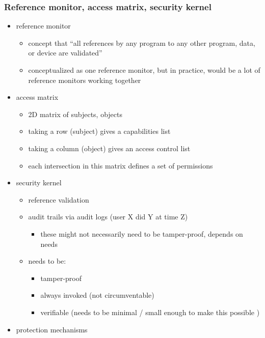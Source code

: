 \documentclass[
  12pt]{findlay}
\providecommand{\tightlist}{%
  \setlength{\itemsep}{0pt}\setlength{\parskip}{0pt}}
\begin{document}
\hypertarget{reference-monitor-access-matrix-security-kernel}{%
\subsubsection{Reference monitor, access matrix, security
kernel}\label{reference-monitor-access-matrix-security-kernel}}

\begin{itemize}
\tightlist
\item
  reference monitor

  \begin{itemize}
  \tightlist
  \item
    concept that ``all references by any program to any other program,
    data, or device are validated''
  \item
    conceptualized as one reference monitor, but in practice, would be a
    lot of reference monitors working together
  \end{itemize}
\item
  access matrix

  \begin{itemize}
  \tightlist
  \item
    2D matrix of subjects, objects
  \item
    taking a row (subject) gives a capabilities list
  \item
    taking a column (object) gives an access control list
  \item
    each intersection in this matrix defines a set of permissions
  \end{itemize}
\item
  security kernel

  \begin{itemize}
  \tightlist
  \item
    reference validation
  \item
    audit trails via audit logs (user X did Y at time Z)

    \begin{itemize}
    \tightlist
    \item
      these might not necessarily need to be tamper-proof, depends on
      needs
    \end{itemize}
  \item
    needs to be:

    \begin{itemize}
    \tightlist
    \item
      tamper-proof
    \item
      always invoked (not circumventable)
    \item
      verifiable (needs to be minimal / small enough to make this
      possible )
    \end{itemize}
  \end{itemize}
\item
  protection mechanisms


\end{itemize}
\end{document}
